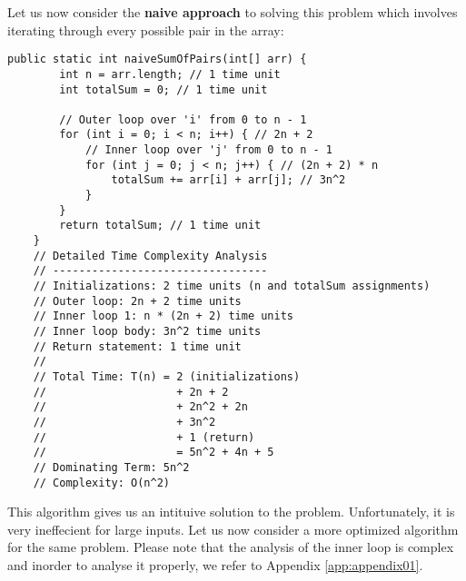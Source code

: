 Let us now consider the \textbf{naive approach} to solving this problem which involves iterating through every possible pair in the array:

\begin{lstlisting}[style = javaStyle, caption={Naive Sum of Pairs with Analysis}, label={lst:java_naive_sum_pairs_analysis}]
    public static int naiveSumOfPairs(int[] arr) {
        int n = arr.length; // 1 time unit
        int totalSum = 0; // 1 time unit

        // Outer loop over 'i' from 0 to n - 1
        for (int i = 0; i < n; i++) { // 2n + 2
            // Inner loop over 'j' from 0 to n - 1
            for (int j = 0; j < n; j++) { // (2n + 2) * n
                totalSum += arr[i] + arr[j]; // 3n^2
            }
        }
        return totalSum; // 1 time unit
    }
    // Detailed Time Complexity Analysis
    // ---------------------------------
    // Initializations: 2 time units (n and totalSum assignments)
    // Outer loop: 2n + 2 time units
    // Inner loop 1: n * (2n + 2) time units
    // Inner loop body: 3n^2 time units
    // Return statement: 1 time unit
    //
    // Total Time: T(n) = 2 (initializations)
    //                    + 2n + 2
    //                    + 2n^2 + 2n
    //                    + 3n^2
    //                    + 1 (return)
    //                    = 5n^2 + 4n + 5
    // Dominating Term: 5n^2
    // Complexity: O(n^2)  
\end{lstlisting}

This algorithm gives us an intituive solution to the problem. Unfortunately, it is very ineffecient for large inputs. Let us now consider a more optimized algorithm for the same problem. Please note that the analysis of the inner loop is complex and inorder to analyse it properly, we refer to Appendix \ref{app:appendix01}.

